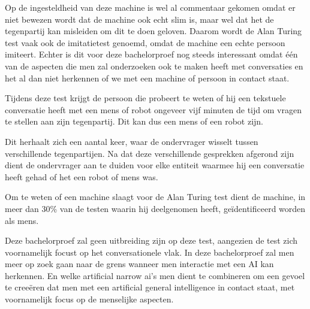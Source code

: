 Op de ingesteldheid van deze machine is wel al commentaar gekomen omdat er niet bewezen wordt dat de machine ook echt slim is, maar wel dat het de tegenpartij kan misleiden om dit te doen geloven. Daarom wordt de Alan Turing test vaak ook de imitatietest genoemd, omdat de machine een echte persoon imiteert. Echter is dit voor deze bachelorproef nog steeds interessant omdat één van de aspecten die men zal onderzoeken ook te maken heeft met conversaties en het al dan niet herkennen of we met een machine of persoon in contact staat. 

Tijdens deze test krijgt de persoon die probeert te weten of hij een tekstuele conversatie heeft met een mens of robot ongeveer vijf minuten de tijd om vragen te stellen aan zijn tegenpartij. Dit kan dus een mens of een robot zijn. 

Dit herhaalt zich een aantal keer, waar de ondervrager wisselt tussen verschillende tegenpartijen. Na dat deze verschillende gesprekken afgerond zijn dient de ondervrager aan te duiden voor elke entiteit waarmee hij een conversatie heeft gehad of het een robot of mens was.

Om te weten of een machine slaagt voor de Alan Turing test dient de machine, in meer dan 30\% van de testen waarin hij deelgenomen heeft, geïdentificeerd worden als mens. 

Deze bachelorproef zal geen uitbreiding zijn op deze test, aangezien de test zich voornamelijk focust op het conversationele vlak. In deze bachelorproef zal men meer op zoek gaan naar de grens wanneer men interactie met een AI kan herkennen. En welke artificial narrow ai's men dient te combineren om een gevoel te creeëren dat men met een artificial general intelligence in contact staat, met voornamelijk focus op de menselijke aspecten.
